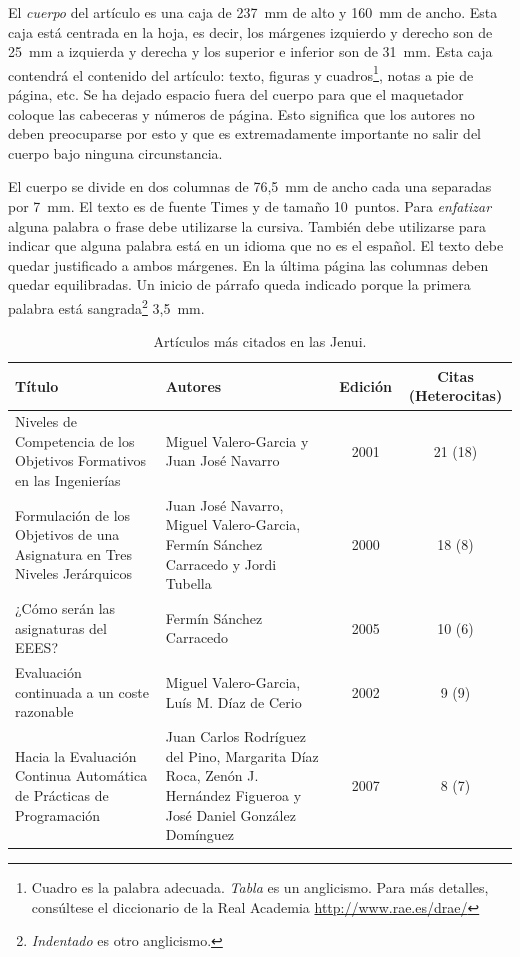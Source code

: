 \documentclass[twocolumn,twoside,a4paper, 10pt]{article}
\begin{document}
El \emph{cuerpo} del artículo es una caja de 237~mm de alto y 160~mm
de ancho.  Esta caja está centrada en la hoja, es decir, los márgenes
izquierdo y derecho son de 25~mm a izquierda y derecha y los superior
e inferior son de 31~mm.  Esta caja contendrá el contenido del
artículo: texto, figuras y cuadros\footnote{Cuadro es la palabra
adecuada. \emph{Tabla} es un anglicismo.  Para más detalles,
consúltese el diccionario de la Real Academia
\url{http://www.rae.es/drae/}}, notas a pie de página, etc.  Se ha
dejado espacio fuera del cuerpo para que el maquetador coloque las
cabeceras y números de página.  Esto significa que los autores no
deben preocuparse por esto y que es extremadamente importante no 
salir del cuerpo bajo ninguna circunstancia.

El cuerpo se divide en dos columnas de 76,5~mm de ancho cada una 
separadas por 7~mm. El texto es de fuente Times y de tamaño 10~puntos. 
Para \emph{enfatizar} alguna palabra o frase debe utilizarse la 
cursiva. También debe utilizarse para indicar que alguna palabra está 
en un idioma que no es el español. El texto debe quedar justificado a 
ambos márgenes. En la última página las columnas deben quedar 
equilibradas.
Un inicio de párrafo queda indicado porque la primera palabra está
sangrada\footnote{\emph{Indentado} es otro anglicismo.} 3,5~mm.

\begin{table}
	\begin{center}
	\begin{tabular}{p{5.2cm}p{4.5cm}cc}
		\textbf{Título} & \textbf{Autores} & \textbf{Edición} & 
		\textbf{Citas (Heterocitas)}\\\hline
		Niveles de Competencia de los Objetivos Formativos en las 
		Ingenierías & Miguel Valero-Garcia y Juan José Navarro & 2001 
		& 21 (18) \\\hline
		Formulación de los Objetivos de una Asignatura en Tres Niveles
		Jerárquicos & Juan José Navarro, Miguel Valero-Garcia, Fermín
		Sánchez Carracedo y Jordi Tubella & 2000 & 18 (8) \\\hline
		¿Cómo serán las asignaturas del EEES? & Fermín Sánchez
		Carracedo & 2005 & 10 (6) \\\hline
		Evaluación continuada a un coste razonable & Miguel
		Valero-Garcia, Luís M. Díaz de Cerio & 2002 & 9 (9) \\\hline
		Hacia la Evaluación Continua Automática de Prácticas de
		Programación & Juan Carlos Rodríguez del Pino, Margarita Díaz
		Roca, Zenón J. Hernández Figueroa y José Daniel González
		Domínguez & 2007 & 8 (7) 
	\end{tabular}
	\end{center}
	\caption{\label{tab:mascit}Artículos más citados en las Jenui.}
\end{table}
\end{document}
